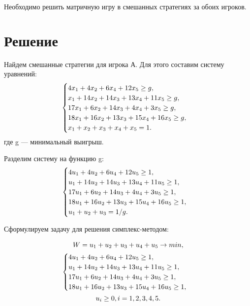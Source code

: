 \documentclass[12pt,a4paper,oneside]{extarticle}
\begin{document}
    Необходимо решить матричную игру в смешанных стратегиях за обоих игроков.

\section{Решение}
    Найдем смешанные стратегии для игрока А. Для этого составим систему уравнений:
    \begin{gather}
        \begin{cases}
            4x_1 + 4x_2 + 6x_4 + 12x_5 \geq g, \\
            x_1 + 14x_2 + 14x_3 + 13x_4 + 11x_5 \geq g, \\
            17x_1 + 6x_2 + 14x_3 + 4x_4 + 3x_5 \geq g, \\
            18x_1 + 16x_2 + 13x_3 + 15x_4 + 16x_5 \geq g, \\
            x_1+x_2+x_3+x_4+x_5=1.
        \end{cases} \notag
    \end{gather} 
    где g --- минимальный выигрыш.

    Разделим систему на функцию g:
    \begin{gather}
        \begin{cases}
            4u_1 + 4u_2 + 6u_4 + 12u_5 \geq 1, \\
            u_1 + 14u_2 + 14u_3 + 13u_4 + 11u_5 \geq 1, \\
            17u_1 + 6u_2 + 14u_3 + 4u_4 + 3u_5 \geq 1, \\
            18u_1 + 16u_2 + 13u_3 + 15u_4 + 16u_5 \geq 1, \\
            u_1+u_2+u_3=1/g.
        \end{cases} \notag
    \end{gather} 

    Сформулируем задачу для решения симплекс-методом:

    \begin{gather}
        W = u_1+u_2+u_3+u_4+u_5 \rightarrow min, \notag \\
        \begin{cases}
            4u_1 + 4u_2 + 6u_4 + 12u_5 \geq 1, \\
            u_1 + 14u_2 + 14u_3 + 13u_4 + 11u_5 \geq 1, \\
            17u_1 + 6u_2 + 14u_3 + 4u_4 + 3u_5 \geq 1, \\
            18u_1 + 16u_2 + 13u_3 + 15u_4 + 16u_5 \geq 1, \\
        \end{cases} \notag \\
        u_i \geq 0, i=1,2,3,4,5.\notag
    \end{gather}
\end{document}
